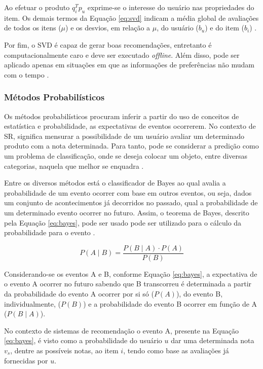         Ao efetuar o produto $q^T_ip_u$ exprime-se o interesse do usuário nas propriedades do item. Os demais termos da Equação \ref{eq:svd} indicam a média global de avaliações de todos os itens ($\mu$) e os desvios, em relação a $\mu$, do usuário ($b_u$) e do item ($b_i$) \cite{Ricci2010}.
        
        Por fim, o SVD é capaz de gerar boas recomendações, entretanto é computacionalmente caro e deve ser executado \textit{offline}. Além disso, pode ser aplicado apenas em situações em que as informações de preferências não mudam com o tempo \cite{Bobadilla_2013}.
        
        \subsubsection{Métodos Probabilísticos}
        
        Os métodos probabilísticos procuram inferir a partir do uso de conceitos de estatística e probabilidade, as expectativas de eventos ocorrerem.  No contexto de SR, significa mensurar a possibilidade de um usuário avaliar um determinado produto com a nota determinada. Para tanto, pode se considerar a predição como um problema de classificação, onde se deseja colocar um objeto, entre diversas categorias, naquela que melhor se enquadra \cite{Jannach2010}.
                
        Entre os diversos métodos está o classificador de Bayes ao qual avalia a probabilidade de um evento ocorrer com base em outros eventos, ou seja, dados um conjunto de acontecimentos já decorridos no passado, qual a probabilidade de um determinado evento ocorrer no futuro. 
        Assim, o teorema de Bayes, descrito pela Equação \ref{eq:bayes}, pode ser usado pode ser utilizado para o cálculo da probabilidade para o evento \cite{Aggarwal2016}.
        
        \begin{equation}
            P(A \mid B) = \frac{P(B \mid A) \cdot P(A)}{P(B)} \label{eq:bayes}
        \end{equation}

        Considerando-se os eventos A e B, conforme Equação \ref{eq:bayes}, a expectativa de o evento A ocorrer no futuro sabendo que B transcorreu é determinada a partir da probabilidade do evento A ocorrer por si só ($P(A)$), do evento B, individualmente, ($P(B)$) e a probabilidade do evento B ocorrer em função de A ($P (B \mid A)$).
        
        No contexto de sistemas de recomendação o evento A, presente na Equação \ref{eq:bayes}, é visto como a probabilidade do usuário $u$ dar uma determinada nota $v_s$, dentre as possíveis notas, ao item $i$, tendo como base as avaliações já fornecidas por $u$. \cite{Aggarwal2016}
        
